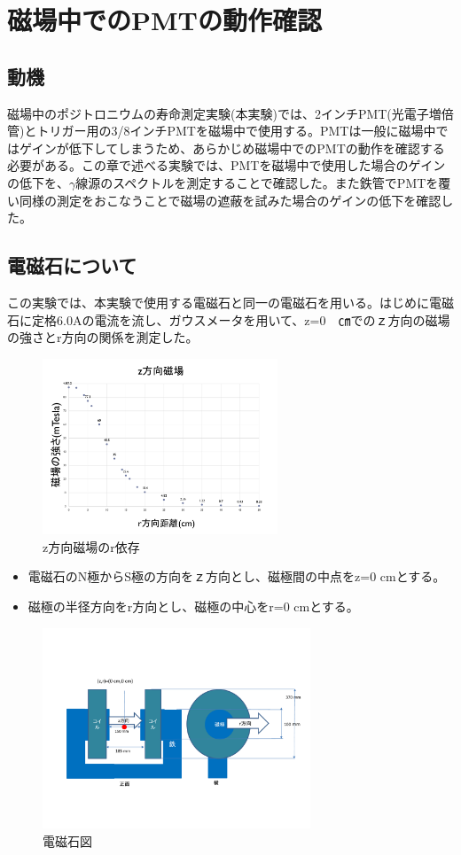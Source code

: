 \chapter{磁場中でのPMTの動作確認}\label{PMT}

\section{動機}
磁場中のポジトロニウムの寿命測定実験(本実験)では、2インチPMT(光電子増倍管)とトリガー用の3/8インチPMTを磁場中で使用する。PMTは一般に磁場中ではゲインが低下してしまうため、あらかじめ磁場中でのPMTの動作を確認する必要がある。この章で述べる実験では、PMTを磁場中で使用した場合のゲインの低下を、$\gamma$線源のスペクトルを測定することで確認した。また鉄管でPMTを覆い同様の測定をおこなうことで磁場の遮蔽を試みた場合のゲインの低下を確認した。



\section{電磁石について}
この実験では、本実験で使用する電磁石と同一の電磁石を用いる。はじめに電磁石に定格6.0Aの電流を流し、ガウスメータを用いて、z=0　㎝でのｚ方向の磁場の強さとr方向の関係を測定した。
\begin{figure}[H]
	\centering
		\includegraphics[width=7cm]{fig/iguchi/maggraph1.pdf}
	\caption{z方向磁場のr依存}
	\label{maggraph1}
\end{figure}

\begin{itemize}
       \item 電磁石のN極からS極の方向をｚ方向とし、磁極間の中点をz=0 cmとする。
       \item 磁極の半径方向をr方向とし、磁極の中心をr=0 cmとする。
\end{itemize}

\begin{figure}[H]
	\centering
		\includegraphics[width=8cm]{fig/iguchi/magnetfigure.pdf}
	\caption{電磁石図}
	\label{magnetfigure}
\end{figure}

